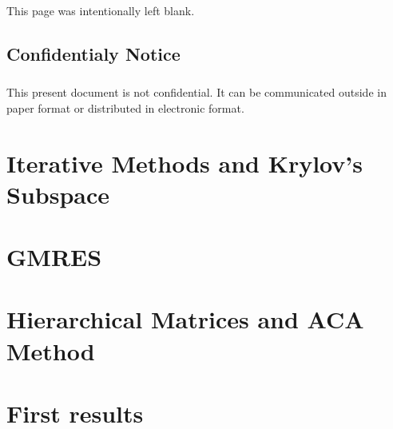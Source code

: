 \documentclass[twoside, 12pt]{report}
\begin{document}
\section*{}
\vfill
\paragraph{}
\begin{center}
  This page was intentionally left blank.
\end{center}
\vfill

\newpage

\section*{Confidentialy Notice}
\vfill
\paragraph{}
This present document is not confidential. It can be communicated outside in paper format
or distributed in electronic format.
\vfill






\newpage
\tableofcontents

\newpage
\listoffigures

\fancyhead[CE]{\leftmark}

\chapter{Iterative Methods and Krylov's Subspace}


\chapter{GMRES}


\chapter{Hierarchical Matrices and ACA Method}


\chapter{First results}


\cleardoublepage %



\nocite{*}

%
\end{document}
